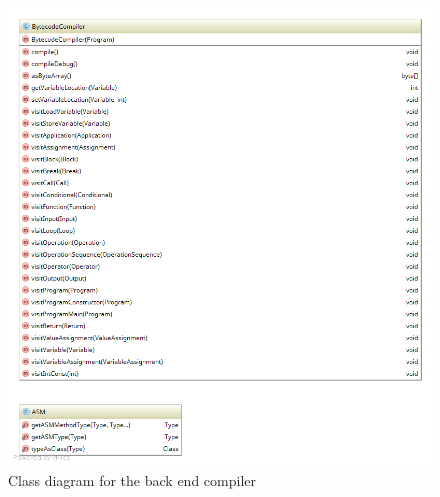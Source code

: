 \begin{figure}[p]
\centering
\includegraphics[scale=0.25]{Images/class_diagram__jvm}
\caption{Class diagram for the back end compiler}
\label{fig:class_diagram__jvm}
\end{figure}
